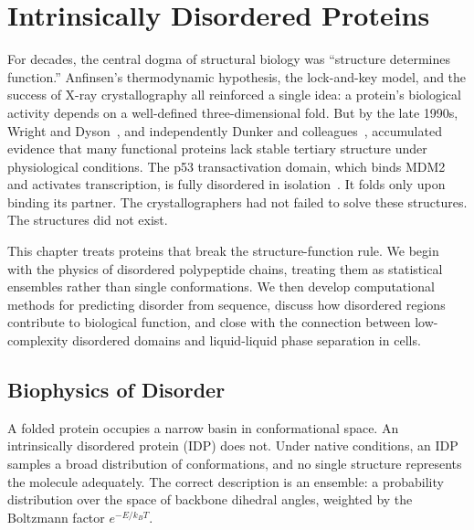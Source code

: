 \chapter{Intrinsically Disordered Proteins}
\label{ch:disorder}

For decades, the central dogma of structural biology was ``structure determines function.''
Anfinsen's thermodynamic hypothesis, the lock-and-key model, and the success of X-ray
crystallography all reinforced a single idea: a protein's biological activity depends on a
well-defined three-dimensional fold.  But by the late 1990s, Wright and
Dyson~\cite{wright1999}, and independently Dunker and colleagues~\cite{dunker2001},
accumulated evidence that many functional proteins lack stable tertiary structure under
physiological conditions.  The p53 transactivation domain, which binds MDM2 and activates
transcription, is fully disordered in isolation~\cite{kussie1996}.  It folds only upon
binding its partner.  The crystallographers had not failed to solve these structures.  The
structures did not exist.

This chapter treats proteins that break the structure-function rule.  We begin with the
physics of disordered polypeptide chains, treating them as statistical ensembles rather than
single conformations.  We then develop computational methods for predicting disorder from
sequence, discuss how disordered regions contribute to biological function, and close with
the connection between low-complexity disordered domains and liquid-liquid phase separation
in cells.

\section{Biophysics of Disorder}
\label{sec:disorder-biophysics}

A folded protein occupies a narrow basin in conformational space.  An intrinsically
disordered protein (IDP) does not.  Under native conditions, an IDP samples a broad
distribution of conformations, and no single structure represents the molecule
adequately.  The correct description is an
ensemble: a probability distribution over the space of backbone dihedral angles, weighted by
the Boltzmann factor $e^{-E/k_BT}$.

